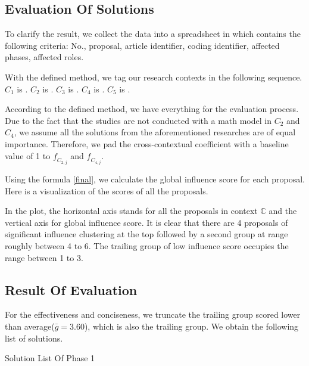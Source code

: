 \subsection{Evaluation Of Solutions}
\label{section:evaluation}
To clarify the result, we collect the data into a spreadsheet in which contains the following criteria: No., proposal, article identifier, coding identifier, affected phases, affected roles.

With the defined method, we tag our research contexts in the following sequence.
$C_{1}$ is .
$C_{2}$ is .
$C_{3}$ is .
$C_{4}$ is .
$C_{5}$ is .

According to the defined method, we have everything for the evaluation process. Due to the fact that the studies are not conducted with a math model in $C_{2}$ and $C_{4}$, we assume all the solutions from the aforementioned researches are of equal importance. Therefore, we pad the cross-contextual coefficient with a baseline value of 1 to $\mathit{f_{C_{2,j}}}$ and $\mathit{f_{C_{4,j}}}$.

Using the formula \ref{final}, we calculate the global influence score for each proposal. Here is a visualization of the scores of all the proposals.

\begin{figure}[ht]
\centering
{}
\end{figure}

In the plot, the horizontal axis stands for all the proposals in context $\mathbb{C}$ and the vertical axis for global influence score. It is clear that there are 4 proposals of significant influence clustering at the top followed by a second group at range roughly between 4 to 6. The trailing group of low influence score occupies the range between 1 to 3.

\subsection{Result Of Evaluation}
For the effectiveness and conciseness, we truncate the trailing group scored lower than average($\bar{g}=3.60$), which is also the trailing group. We obtain the following list of solutions.

\begin{table}[ht]
\caption{Solution List Of Phase 1}
\begin{adjustbox}{width=1\textwidth}
\end{adjustbox}
\label{tab:solution}
\end{table}

